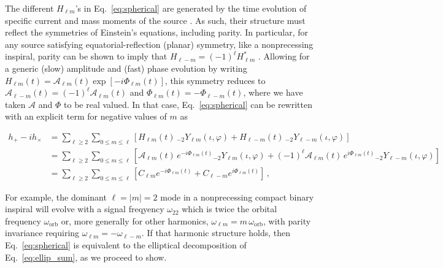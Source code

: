 \documentclass[aps,prd,twocolumn,superscriptaddress,preprintnumbers,floatfix,nofootinbib]{revtex4-2}
\newcommand*{\eq}[1]{Eq.~\eqref{eq:#1}}
\begin{document}
The different $H_{\ell m}$'s in \eq{spherical} are generated by the time evolution of specific current and mass moments of the source \cite{Thorne:1980ru}.
As such, their structure must reflect the symmetries of Einstein's equations, including parity.
In particular, for any source satisfying equatorial-reflection (planar) symmetry, like a nonprecessing inspiral, parity can be shown to imply that $H_{\ell -m} = (-1)^\ell H_{\ell m}^*$ \cite{Faye:2012we}.
Allowing for a generic (slow) amplitude and (fast) phase evolution by writing $H_{\ell m}(t) = \mathcal{A}_{\ell m}(t) \exp[-i \Phi_{\ell m}(t)]$, this symmetry reduces to $\mathcal{A}_{\ell -m}(t) = (-1)^\ell \mathcal{A}_{\ell m}(t)$ and $\Phi_{\ell m}(t) = - \Phi_{\ell -m}(t)$, where we have taken $\mathcal{A}$ and $\Phi$ to be real valued.
In that case, \eq{spherical} can be rewritten with an explicit term for negative values of $m$ as
\begin{widetext}
\begin{subequations} \label{eq:spherical_modes}
\begin{align}
h_+ - i h_\times &= \sum_{\ell \geq 2} \sum_{0\leq m \leq \ell} \left[H_{\ell m}(t)\, {}_{-2}Y_{\ell m} (\iota, \varphi) + H_{\ell -m}(t)\, {}_{-2}Y_{\ell -m} (\iota, \varphi) \right] \\
&= \sum_{\ell \geq 2} \sum_{0\leq m \leq \ell} \left[\mathcal{A}_{\ell m}(t)\, e^{-i\Phi_{\ell m} (t)} {}_{-2}Y_{\ell m}(\iota, \varphi) +  (-1)^\ell \mathcal{A}_{\ell m}(t)\, e^{i\Phi_{\ell m} (t)} {}_{-2}Y_{\ell- m}(\iota, \varphi) \right] \\
&= \sum_{\ell \geq 2} \sum_{0\leq m \leq \ell} \left[C_{\ell m} e^{-i\Phi_{\ell m} (t)}  +  C_{\ell -m} e^{i\Phi_{\ell m} (t)} \right]\, ,
\end{align}
\end{subequations}
\end{widetext}

For example, the dominant $\ell= |m|=2$ mode in a nonprecessing compact binary inspiral will evolve with a signal freqyency $\omega_{22}$ which is twice the orbital frequency $\omega_\mathrm{orb}$ or, more generally for other harmonics, $\omega_{\ell m} = m\, \omega_\mathrm{orb}$, with parity invariance requiring $\omega_{\ell m}= - \omega_{\ell - m}$.
If that harmonic structure holds, then Eq.~\eqref{eq:spherical} is equivalent to the elliptical decomposition of Eq.~\eqref{eq:ellip_sum}, as we proceed to show.
\end{document}
